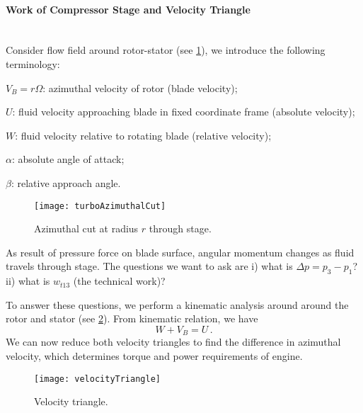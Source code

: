 \paragraph{Work of Compressor Stage and Velocity Triangle} \mbox{} \\[0.5em]
Consider flow field around rotor-stator (see \cref{FIG_AZIMUTHAL_CUT}), we introduce the following terminology:
\begin{itemizePacked}
\item $V_B = r \Omega$: azimuthal velocity of rotor (blade velocity);
\item $U$: fluid velocity approaching blade in fixed coordinate frame (absolute velocity);
\item $W$: fluid velocity relative to rotating blade (relative velocity);
\item $\alpha$: absolute angle of attack;
\item $\beta$: relative approach angle.
\end{itemizePacked}

\begin{figure}[!htb!]
 \centering
    {\texttt{[image: turboAzimuthalCut]}}
    \caption{\label{FIG_AZIMUTHAL_CUT}Azimuthal cut at radius $r$ through stage.}
\end{figure}

As result of pressure force on blade surface, angular momentum changes as fluid travels through stage. The questions we want to ask are i) what is $\Delta p = p_3-p_1$? ii) what is $w_{t13}$ (the technical work)?

To answer these questions, we perform a kinematic analysis around around the rotor and stator (see \cref{FIG_VELOCITY_TRIANGLE}). From kinematic relation, we have
\[
  W + V_B = U\,.
\]
We can now reduce both velocity triangles to find the difference in azimuthal velocity, which determines torque and power requirements of engine.

\begin{figure}[!htb!]
 \centering
    {\texttt{[image: velocityTriangle]}}
    \caption{\label{FIG_VELOCITY_TRIANGLE}Velocity triangle.}
\end{figure}

